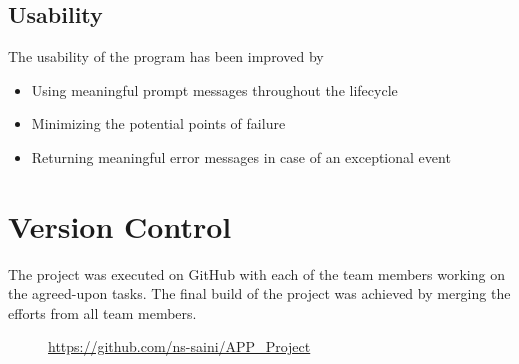     \subsection{Usability}
    \begin{flushleft}
      The usability of the program has been improved by 
      \begin{itemize}
        \item {Using meaningful prompt messages throughout the lifecycle }
        \item {Minimizing the potential points of failure }
        \item {Returning meaningful error messages in case of an exceptional event}
      \end{itemize}
    \end{flushleft}
  
  \section{Version Control}
    The project was executed on GitHub with each of the team members working on the agreed-upon tasks. The final build of the project was achieved by merging the efforts from all team members.
    
    \begin{figure}[h!]
      \centering
      \caption{\url{https://github.com/ns-saini/APP_Project}}
      \label{fig:Repository}
    \end{figure}


